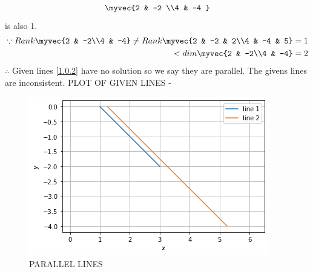 \documentclass[journal,12pt,twocolumn]{IEEEtran}
\begin{document}
\begin{enumerate}
\begin{align}
\myvec{2 & -2 \\4 & -4 } 
\end{align}
%
is also 1.
%
\begin{align}
\because Rank \myvec{2 & -2\\4 & -4} \ne Rank\myvec{2 & -2 & 2\\4 & -4 & 5}=1\nonumber\\<dim\myvec{2 & -2\\4 & -4}=2
\end{align}
$\therefore$ Given lines \eqref{1.0.2} have no solution so we say they are parallel. The givens lines are inconsistent. 
PLOT OF GIVEN LINES -

\begin{figure}[ht]
    \centering
   \includegraphics[width=\columnwidth]{parallel lines.png}
    \caption{PARALLEL LINES}
    \label{fig: PARALLEL LINES.}
\end{figure}    
\end{enumerate}
\end{document}
